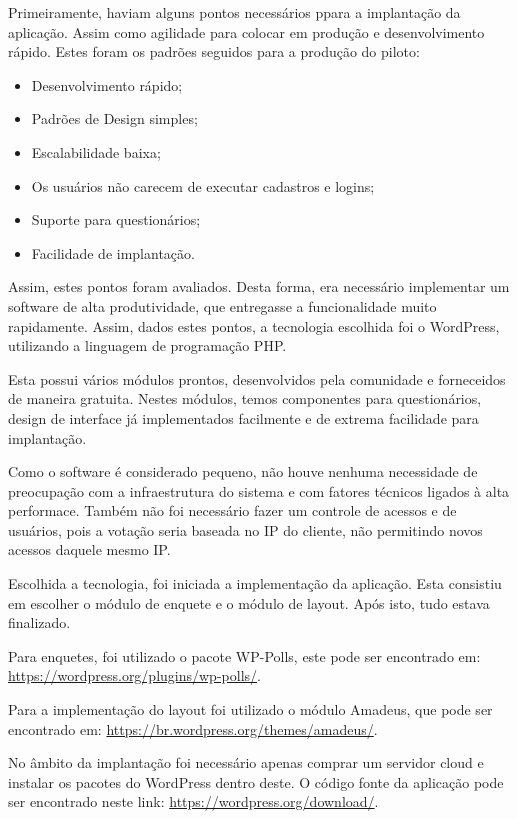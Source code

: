 Primeiramente, haviam alguns pontos necessários ppara a implantação da aplicação. Assim como agilidade para colocar
em produção e desenvolvimento rápido. Estes foram os padrões seguidos para a produção do piloto:


\begin{itemize}
    \item Desenvolvimento rápido;
    \item Padrões de Design simples;
    \item Escalabilidade baixa;
    \item Os usuários não carecem de executar cadastros e logins;
    \item Suporte para questionários;
    \item Facilidade de implantação.
\end{itemize}

Assim, estes pontos foram avaliados. Desta forma, era necessário implementar um software
de alta produtividade, que entregasse a funcionalidade muito rapidamente. Assim, dados estes
pontos, a tecnologia escolhida foi o WordPress, utilizando a linguagem de programação PHP.

Esta possui vários módulos prontos, desenvolvidos pela comunidade e forneceidos de maneira
gratuita. Nestes módulos, temos componentes para questionários, design de interface já
implementados facilmente e de extrema facilidade para implantação.

Como o software é considerado pequeno, não houve nenhuma necessidade de preocupação com a
infraestrutura  do sistema e com fatores técnicos ligados à alta performace. Também não foi
necessário fazer um controle de acessos e de usuários, pois a votação seria baseada no IP
do cliente, não permitindo novos acessos daquele mesmo IP.

Escolhida a tecnologia, foi iniciada a implementação da aplicação. Esta consistiu em escolher o
módulo de enquete e o módulo de layout. Após isto, tudo estava finalizado.

Para enquetes, foi
utilizado o pacote WP-Polls, este pode ser encontrado em: \url{https://wordpress.org/plugins/wp-polls/}.

Para a implementação do layout foi utilizado o módulo Amadeus, que pode ser encontrado em:
\url{https://br.wordpress.org/themes/amadeus/}.

No âmbito da implantação foi necessário apenas comprar um servidor cloud e instalar os pacotes do WordPress
dentro deste. O código fonte da aplicação pode ser encontrado neste link:
\url{https://wordpress.org/download/}.

